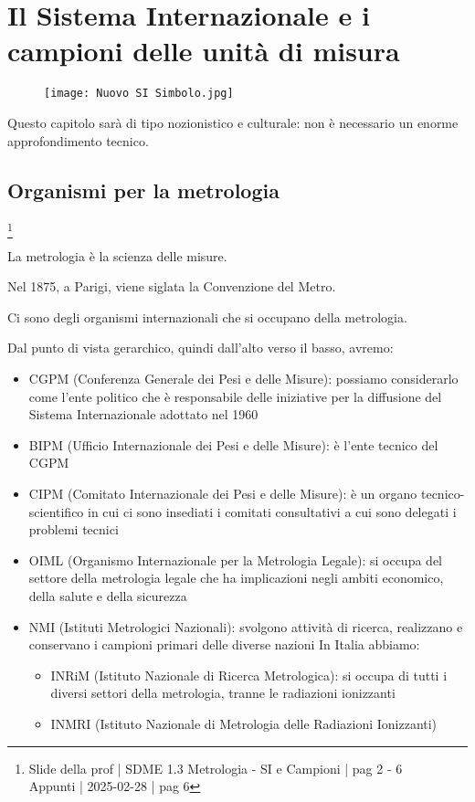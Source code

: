 \chapter{Il Sistema Internazionale e i campioni delle unità di misura}

\begin{figure}[h]
    \centering
    \texttt{[image: Nuovo SI Simbolo.jpg]}
\end{figure}

\newpage 

\begin{tcolorbox}
Questo capitolo sarà di tipo nozionistico e culturale: non è necessario un enorme approfondimento tecnico.     
\end{tcolorbox}

\section{Organismi per la metrologia} 
\footnote{Slide della prof | SDME 1.3 Metrologia - SI e Campioni | pag 2 - 6 \\  
Appunti | 2025-02-28 | pag 6}

La metrologia è la scienza delle misure. \newline 

Nel 1875, a Parigi, viene siglata la Convenzione del Metro. \newline 

Ci sono degli organismi internazionali che si occupano della metrologia. \newline 

Dal punto di vista gerarchico, quindi dall'alto verso il basso, avremo: 

\begin{itemize}
    \item CGPM (Conferenza Generale dei Pesi e delle Misure): possiamo considerarlo come l'ente politico che è responsabile delle iniziative per la diffusione del Sistema Internazionale adottato nel 1960 
    \item BIPM (Ufficio Internazionale dei Pesi e delle Misure): è l'ente tecnico del CGPM 
    \item CIPM (Comitato Internazionale dei Pesi e delle Misure): è un organo tecnico-scientifico in cui ci sono insediati i comitati consultativi a cui sono delegati i problemi tecnici  
    \item OIML (Organismo Internazionale per la Metrologia Legale): si occupa del settore della metrologia legale che ha implicazioni negli ambiti economico, della salute e della sicurezza 
    \item NMI (Istituti Metrologici Nazionali): svolgono attività di ricerca, realizzano e conservano i campioni primari delle diverse nazioni 
    In Italia abbiamo:
    \begin{itemize} 
        \item INRiM (Istituto Nazionale di Ricerca Metrologica): si occupa di tutti i diversi settori della metrologia, tranne le radiazioni ionizzanti  
        \item INMRI (Istituto Nazionale di Metrologia delle Radiazioni Ionizzanti)
    \end{itemize}
\end{itemize}

